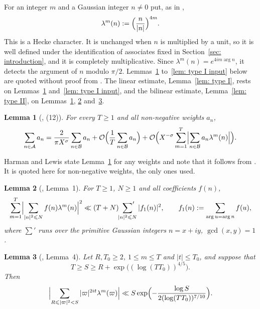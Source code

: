 \documentclass{article}
\numberwithin{equation}{section}
\newtheorem{lemma}{Lemma}
\newcommand{\Le}{\leqslant}
\newcommand{\Ge}{\geqslant}
\begin{document}
For an integer $m$ and a Gaussian integer $n \neq 0$ put, as in \citet[p.~122]{harman2001gaussian},
\begin{equation}
\label{eq: hecke character}
\lambda^m(n) := \Bigl( \frac{n}{|n|} \Bigr)^{4m}.
\end{equation}
This is a Hecke character. It is unchanged when $n$ is multiplied by a unit, so it is well defined under the identification of associates fixed in Section~\ref{sec: introduction}, and it is completely multiplicative. Since $\lambda^m(n) = e^{4im \arg n}$, it detects the argument of $n$ modulo $\pi/2$. Lemmas~\ref{lem: sector inequality} to~\ref{lem: type I input} below are quoted without proof from \citet{harman2001gaussian}. The linear estimate, Lemma~\ref{lem: type I}, rests on Lemmas~\ref{lem: sector inequality} and~\ref{lem: type I input}, and the bilinear estimate, Lemma~\ref{lem: type II}, on Lemmas~\ref{lem: sector inequality}, \ref{lem: mean value} and~\ref{lem: hecke pnt}.

\begin{lemma}[\citet{harman2001gaussian}, (12)]
\label{lem: sector inequality}
For every $T \Ge 1$ and all non-negative weights $a_n$,
\begin{equation*}
\sum_{n \in \mathcal{A}} a_n = \frac{2}{\pi X^{\sigma}} \sum_{n \in \mathcal{B}} a_n + \mathcal{O}\Bigl( \frac{1}{T} \sum_{n \in \mathcal{B}} a_n \Bigr) + \mathcal{O}\Bigl( X^{-\sigma} \sum_{m = 1}^{T} \Bigl| \sum_{n \in \mathcal{B}} a_n \lambda^m(n) \Bigr| \Bigr).
\end{equation*}
\end{lemma}

Harman and Lewis state Lemma~\ref{lem: sector inequality} for any weights and note that it follows from \citet[Chapter~2]{baker1986diophantine}. It is quoted here for non-negative weights, the only ones used.

\begin{lemma}[\citet{harman2001gaussian}, Lemma~1]
\label{lem: mean value}
For $T \Ge 1$, $N \Ge 1$ and all coefficients $f(n)$,
\begin{equation*}
\sum_{m = 1}^{T} \Bigl| \sum_{|n|^2 \Le N} f(n) \lambda^m(n) \Bigr|^2 \ll (T + N) \sideset{}{'}\sum_{|n|^2 \Le N} |f_1(n)|^2, \qquad f_1(n) := \sum_{\arg u = \arg n} f(u),
\end{equation*}
where $\sum'$ runs over the primitive Gaussian integers $n = x + iy$, $\gcd(x, y) = 1$.
\end{lemma}

\begin{lemma}[\citet{harman2001gaussian}, Lemma~4]
\label{lem: hecke pnt}
Let $R, T_0 \Ge 2$, $1 \Le m \Le T$ and $|t| \Le T_0$, and suppose that
\begin{equation*}
T \Ge S \Ge R + \exp\bigl( (\log(T T_0))^{4/5} \bigr).
\end{equation*}
Then
\begin{equation*}
\Bigl| \sum_{R \Le |\varpi|^2 < S} |\varpi|^{2it} \lambda^m(\varpi) \Bigr| \ll S \exp\Bigl( -\frac{\log S}{2 (\log(T T_0))^{7/10}} \Bigr).
\end{equation*}
\end{lemma}
\end{document}
